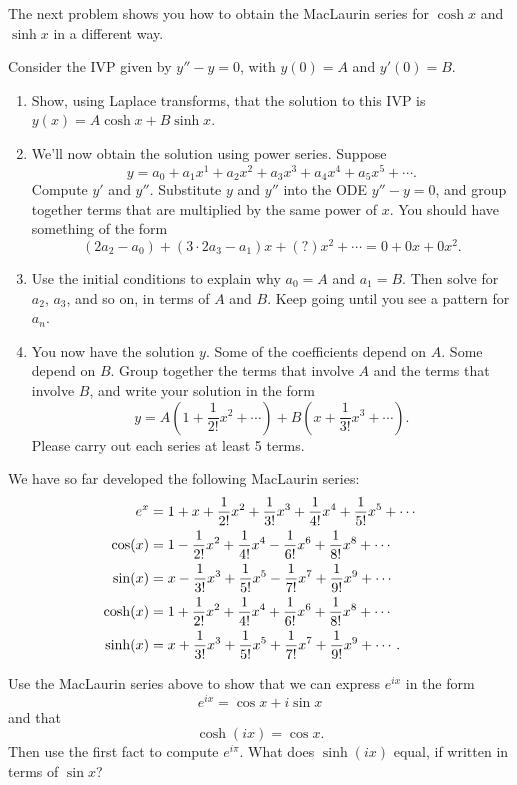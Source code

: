 The next problem shows you how to obtain the MacLaurin series for $\cosh x$ and $\sinh x$ in a different way. 

\begin{problem}
Consider the IVP given by $y''-y=0$, with $y(0)=A$ and $y'(0)=B$.
\begin{enumerate}
 \item Show, using Laplace transforms, that the solution to this IVP is $y(x) = A\cosh x+B\sinh x$.
 \item We'll now obtain the solution using power series. Suppose $$y=a_0+a_1x^1+a_2x^2+a_3x^3+a_4x^4 + a_5x^5 + \cdots. $$
 Compute $y'$ and $y''$. Substitute $y$ and $y''$ into the ODE $y''-y =0$, and group together terms that are multiplied by the same power of $x$.  You should have something of the form 
$$(2a_2-a_0) + (3\cdot 2a_3 - a_1)x + (?)x^2 + \cdots = 0+0x+0x^2.$$
 \item Use the initial conditions to explain why $a_0=A$ and $a_1=B$.  Then solve for $a_2$, $a_3$, and so on, in terms of $A$ and $B$. Keep going until you see a pattern for $a_n$.
 \item You now have the solution $y$.  Some of the coefficients depend on $A$.  Some depend on $B$.  Group together the terms that involve $A$ and the terms that involve $B$, and write your solution in the form  
 $$y=A(1+\frac{1}{2!}x^2+\cdots)+B(x+\frac{1}{3!}x^3+\cdots). $$
 Please carry out each series at least 5 terms.
\end{enumerate}
\end{problem}

We have so far developed the following MacLaurin series:
\begin{align*}
\displaystyle e^x &= 1+x+\frac{1}{2!}x^2+\frac{1}{3!}x^3+\frac{1}{4!}x^4+\frac{1}{5!}x^5+\cdots\\
\displaystyle \cos(x) & = 1-\frac{1}{2!}x^2+\frac{1}{4!}x^4-\frac{1}{6!}x^6+\frac{1}{8!}x^8+\cdots\\
\displaystyle \sin(x) & = x-\frac{1}{3!}x^3+\frac{1}{5!}x^5-\frac{1}{7!}x^7+\frac{1}{9!}x^9+\cdots\\
\displaystyle \cosh(x) & = 1+\frac{1}{2!}x^2+\frac{1}{4!}x^4+\frac{1}{6!}x^6+\frac{1}{8!}x^8+\cdots\\
\displaystyle \sinh(x) & = x+\frac{1}{3!}x^3+\frac{1}{5!}x^5+\frac{1}{7!}x^7+\frac{1}{9!}x^9+\cdots.
\end{align*}

\begin{problem}
%
Use the MacLaurin series above to show that we can express $e^{ix}$ in the form $$e^{ix}=\cos x+i\sin x$$ and that 
$$\cosh(ix) = \cos x.$$
Then use the first fact to compute $e^{i\pi}$. 
What does $\sinh(ix)$ equal, if written in terms of $\sin x$?
\end{problem}

